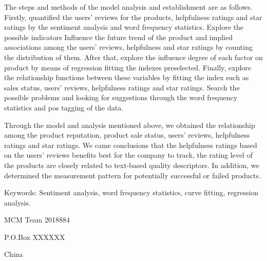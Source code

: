 \documentclass[12pt]{article}
\begin{document}
\par
The steps and methods of the model analysis and establishment are as follows. Firstly, quantified the users' reviews for the products, helpfulness ratings and star ratings by the sentiment analysis and word frequency statistics. Explore the possible indicators Influence the future trend of the product and implied associations among the users' reviews, helpfulness and star ratings by counting the distribution of them. After that, explore the influence degree of each factor on product by means of regression fitting the indexes preselected. Finally, explore the relationship functions between these variables by fitting the index such as sales status, users' reviews, helpfulness ratings and star ratings. Search the possible problems and looking for suggestions through the word frequency statistics and pos tagging of the data.
\par
Through the model and analysis mentioned above, we obtained the relationship among the product reputation, product sale status, users' reviews, helpfulness ratings and star ratings. We came conclusions that the helpfulness ratings based on the users' reviews benefits best for the company to track, the rating level of the products are closely related to text-based quality descriptors. In addition, we determined the measurement pattern for potentially successful or failed products.
\par
Keywords: Sentiment analysis, word frequency statistics, curve fitting, regression analysis.
\newpage
\quad\newline\quad\par

\quad\quad\quad\quad\quad\quad\quad\quad\quad\quad\quad\quad\quad\quad
\quad\quad\quad\quad\quad\quad\quad\quad\quad\quad\quad\quad\quad\quad
MCM Team 2018884
\par
\quad\quad\quad\quad\quad\quad\quad\quad\quad\quad\quad\quad\quad\quad
\quad\quad\quad\quad\quad\quad\quad\quad\quad\quad\quad\quad\quad\quad
P.O.Box XXXXXX
\par\quad\par
\quad\quad\quad\quad\quad\quad\quad\quad\quad\quad\quad\quad\quad\quad
\quad\quad\quad\quad\quad\quad\quad\quad\quad\quad\quad\quad\quad\quad
China
\end{document}

